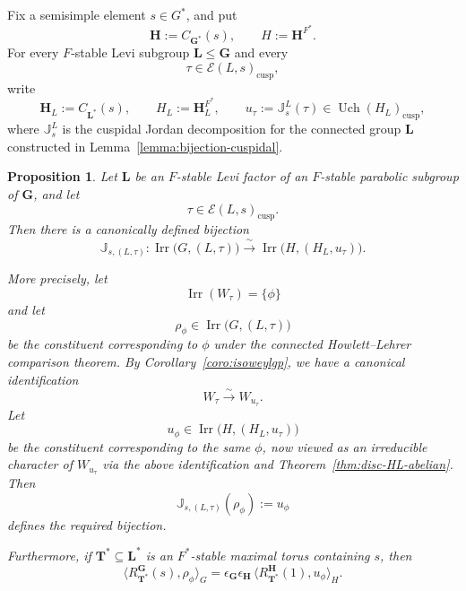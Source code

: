 \documentclass{amsart}
\theoremstyle{plain}
\numberwithin{equation}{section}
\newtheorem{proposition}[theorem]{Proposition}
\theoremstyle{definition}
\newcommand{\cE}{\mathcal{E}}
\newcommand{\Irr}{\operatorname{Irr}}
\newcommand{\Uch}{\operatorname{Uch}}
\newcommand{\J}{\mathbb{J}}
\newcommand{\cusp}{\operatorname{cusp}}
\newcommand{\bG}{\mathbf{G}}
\newcommand{\bL}{\mathbf{L}}
\newcommand{\bT}{\mathbf{T}}
\newcommand{\bH}{\mathbf{H}}
\begin{document}
Fix a semisimple element \(s\in G^*\), and put
\[
\bH:=C_{\bG^*}(s),\qquad H:=\bH^{F^*}.
\]
For every \(F\)-stable Levi subgroup \(\bL\leq \bG\) and every
\[
\tau\in \cE(L,s)_{\cusp},
\]
write
\[
\bH_L:=C_{\bL^*}(s),\qquad H_L:=\bH_L^{F^*},\qquad
u_\tau:=\J_s^L(\tau)\in \Uch(H_L)_{\cusp},
\]
where \(\J_s^L\) is the cuspidal Jordan decomposition for the connected group \(\bL\)
constructed in Lemma~\ref{lemma:bijection-cuspidal}.

\medskip

\begin{proposition}\label{prop:passage-cusp-to-HC}
Let \(\bL\) be an \(F\)-stable Levi factor of an \(F\)-stable parabolic subgroup of
\(\bG\), and let
\[
\tau\in \cE(L,s)_{\cusp}.
\]
Then there is a canonically defined bijection
\[
\J_{s,(L,\tau)}:\Irr\bigl(G,(L,\tau)\bigr)\xrightarrow{\ \sim\ }
\Irr\bigl(H,(H_L,u_\tau)\bigr).
\]

More precisely, let
\[
\Irr(W_\tau)=\{\phi\}
\]
and let
\[
\rho_\phi\in \Irr\bigl(G,(L,\tau)\bigr)
\]
be the constituent corresponding to \(\phi\) under the connected
Howlett--Lehrer comparison theorem. By Corollary~\ref{coro:isoweylgp}, we have a
canonical identification
\[
W_\tau \xrightarrow{\sim} W_{u_\tau}.
\]
Let
\[
u_\phi\in \Irr\bigl(H,(H_L,u_\tau)\bigr)
\]
be the constituent corresponding to the same \(\phi\), now viewed as an irreducible
character of \(W_{u_\tau}\) via the above identification and
Theorem~\ref{thm:disc-HL-abelian}. Then
\[
\J_{s,(L,\tau)}(\rho_\phi):=u_\phi
\]
defines the required bijection.

Furthermore, if \(\bT^*\subseteq \bL^*\) is an \(F^*\)-stable maximal torus containing
\(s\), then
\[
\bigl\langle R_{\bT^*}^{\bG}(s),\rho_\phi\bigr\rangle_G
=
\epsilon_{\bG}\epsilon_{\bH}\,
\bigl\langle R_{\bT^*}^{\bH}(1),u_\phi\bigr\rangle_H.
\]
\end{proposition}
\end{document}
